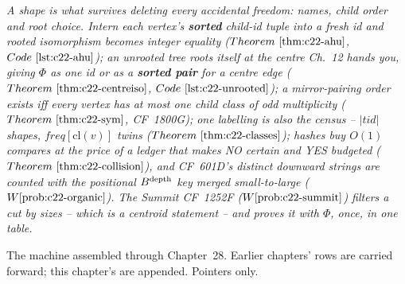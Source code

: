 \begin{recallbox}
\emph{A shape is what survives deleting every accidental freedom: names, child order and
root choice. Intern each vertex's \textbf{sorted} child-id tuple into a fresh id and rooted
isomorphism becomes integer equality (\(\thmref{c22-ahu}\), \(\coderef{c22-ahu}\)); an
unrooted tree roots itself at the centre Ch.~12 hands you, giving \(\Phi\) as one id or as a
\textbf{sorted pair} for a centre edge (\(\thmref{c22-centreiso}\),
\(\coderef{c22-unrooted}\)); a mirror-pairing order exists iff every vertex has at most one
child class of odd multiplicity (\(\thmref{c22-sym}\), CF~1800G); one labelling is also the
census -- \(|\mathit{tid}|\) shapes, \(\mathit{freq}[\mathrm{cl}(v)]\) twins
(\(\thmref{c22-classes}\)); hashes buy \(O(1)\) compares at the price of a ledger that makes
NO certain and YES budgeted (\(\thmref{c22-collision}\)), and CF~601D's distinct downward
strings are counted with the \emph{positional} \(B^{\operatorname{depth}}\) key merged small-to-large
(\(\probref{c22-organic}\)). The Summit CF~1252F (\(\probref{c22-summit}\)) filters a cut by
sizes -- which is a centroid statement -- and proves it with \(\Phi\), once, in one table.}
\end{recallbox}


The machine assembled through Chapter~28. Earlier chapters' rows are carried forward;
this chapter's are appended. Pointers only.

